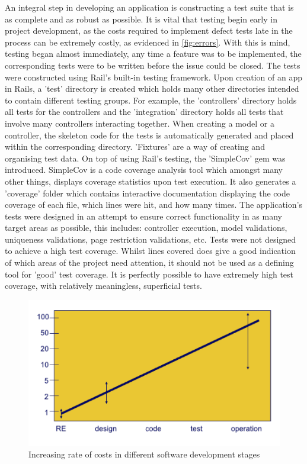 \documentclass{l3proj}
\begin{document}
An integral step in developing an application is constructing a test suite that is as complete and as robust as possible. It is vital that testing begin early in project development, as the costs required to implement defect tests late in the process can be extremely costly, as evidenced in \autoref{fig:errors}. With this is mind, testing began almost immediately, any time a feature was to be implemented, the corresponding tests were to be written before the issue could be closed. The tests were constructed using Rail's built-in testing framework. Upon creation of an app in Rails, a 'test' directory is created which holds many other directories intended to contain different testing groups. For example, the 'controllers' directory holds all tests for the controllers and the 'integration' directory holds all tests that involve many controllers interacting together. When creating a model or a controller, the skeleton code for the tests is automatically generated and placed within the corresponding directory. 'Fixtures' are a way of creating and organising test data. On top of using Rail's testing, the 'SimpleCov' gem was introduced. SimpleCov is a code coverage analysis tool which amongst many other things, displays coverage statistics upon test execution. It also generates a 'coverage' folder which contains interactive documentation displaying the code coverage of each file, which lines were hit, and how many times. The application's tests were designed in an attempt to ensure correct functionality in as many target areas as possible, this includes: controller execution, model validations, uniqueness validations, page restriction validations, etc. Tests were not designed to achieve a high test coverage. Whilst lines covered does give a good indication of which areas of the project need attention, it should not be used as a defining tool for 'good' test coverage. It is perfectly possible to have extremely high test coverage, with relatively meaningless, superficial tests.

\begin{figure}[ht]
\centerline{\includegraphics[width=\textwidth, height=\textheight, keepaspectratio]{costOfErrors.png}}
\caption{Increasing rate of costs in different software development stages }
\label{fig:errors}
\end{figure}
\end{document}
